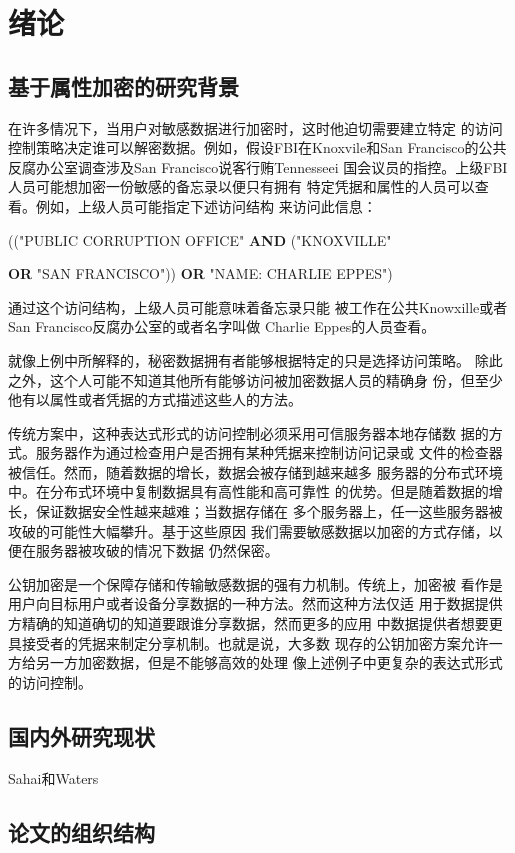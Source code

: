 \chapter{绪论}
\section{基于属性加密的研究背景}
在许多情况下，当用户对敏感数据进行加密时，这时他迫切需要建立特定
的访问控制策略决定谁可以解密数据。例如，假设FBI在Knoxvile和San
Francisco的公共反腐办公室调查涉及San Francisco说客行贿Tennesseei
国会议员的指控。上级FBI人员可能想加密一份敏感的备忘录以便只有拥有
特定凭据和属性的人员可以查看。例如，上级人员可能指定下述访问结构
来访问此信息：
\centerline{\textsc{(("PUBLIC CORRUPTION OFFICE" \textbf{AND} 
("KNOXVILLE" }}
\centerline{\textsc{\textbf{OR} "SAN FRANCISCO"))
\textbf{OR} "NAME: CHARLIE EPPES")}} 
通过这个访问结构，上级人员可能意味着备忘录只能
被工作在公共Knowxille或者San Francisco反腐办公室的或者名字叫做
Charlie Eppes的人员查看。\par
就像上例中所解释的，秘密数据拥有者能够根据特定的只是选择访问策略。
除此之外，这个人可能不知道其他所有能够访问被加密数据人员的精确身
份，但至少他有以属性或者凭据的方式描述这些人的方法。\par
传统方案中，这种表达式形式的访问控制必须采用可信服务器本地存储数
据的方式。服务器作为通过检查用户是否拥有某种凭据来控制访问记录或
文件的检查器被信任。然而，随着数据的增长，数据会被存储到越来越多
服务器的分布式环境中。在分布式环境中复制数据具有高性能和高可靠性
的优势。但是随着数据的增长，保证数据安全性越来越难；当数据存储在
多个服务器上，任一这些服务器被攻破的可能性大幅攀升。基于这些原因
我们需要敏感数据以加密的方式存储，以便在服务器被攻破的情况下数据
仍然保密。\par
公钥加密是一个保障存储和传输敏感数据的强有力机制。传统上，加密被
看作是用户向目标用户或者设备分享数据的一种方法。然而这种方法仅适
用于数据提供方精确的知道确切的知道要跟谁分享数据，然而更多的应用
中数据提供者想要更具接受者的凭据来制定分享机制。也就是说，大多数
现存的公钥加密方案允许一方给另一方加密数据，但是不能够高效的处理
像上述例子中更复杂的表达式形式的访问控制。\par
\section{国内外研究现状}
Sahai和Waters\cite{my}
\section{论文的组织结构}
